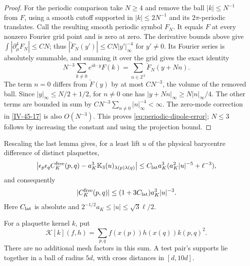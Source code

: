 \documentclass[11pt,letterpaper,reqno]{amsart}
\theoremstyle{definition}
\theoremstyle{remark}
\begin{document}
\begin{proof}
For the periodic comparison take $N\ge4$ and remove the ball
$|k|\le N^{-1}$ from $F$, using a smooth cutoff supported
in $|k|\le2N^{-1}$ and its $2\pi$-periodic translates.
Call the resulting smooth periodic symbol $F_N$.  It equals
$F$ at every nonzero Fourier grid point and is zero at zero.
The derivative bounds above give
$\int|\partial_\mu^4F_N|\le CN$; thus
$|\check F_N(y')|\le CN|y'|_\infty^{-4}$ for $y'\ne0$.
Its Fourier series is absolutely summable, and summing it over
the grid gives the exact identity
\[
 N^{-3}\sum_{k\ne0}e^{ik\cdot y}F(k)
                         =\sum_{n\in\mathbb Z^3}\check F_N(y+Nn).
\]
The term $n=0$ differs from $\check F(y)$ by at most $CN^{-3}$,
the volume of the removed ball.  Since
$|y|_\infty\le N/2+1/2$, for $n\ne0$ one has
$|y+Nn|_\infty\ge N|n|_\infty/4$.  The other terms are
bounded in sum by
$CN^{-3}\sum_{n\ne0}|n|_\infty^{-4}<\infty$.
The zero-mode correction in \eqref{IV-45-17} is also $O(N^{-3})$.
This proves \eqref{eq:periodic-dipole-error}; $N\le3$ follows
by increasing the constant and using the projection bound.
\end{proof}

Rescaling the last lemma gives, for a least lift $u$ of the
physical barycentre difference of distinct plaquettes,
\begin{equation}\label{IV-45-31}
 \big|\epsilon_p\epsilon_q C^{\rm free}_K(p,q)
           -a_K^3\mathbb K_3(u)_{\lambda(p)\lambda(q)}\big|
   \le C_{\rm lat}a_K^3(a_K^2|u|^{-5}+\ell^{-3}),
\end{equation}
and consequently
\begin{equation}\label{IV-45-32}
 |C^{\rm free}_K(p,q)|\le(1+3C_{\rm lat})a_K^3|u|^{-3}.
\end{equation}
Here $C_{\rm lat}$ is absolute and
$2^{-1/2}a_K\le|u|\le\sqrt3\ell/2$.


For a plaquette kernel $k$, put
\[
 \mathcal K[k](f,h)=\sum_{p,q}f(x(p))h(x(q))k(p,q)^2.
\]
There are no additional mesh factors in this sum. A test pair's
supports lie together in a ball of radius $5d$, with cross distances
in $[d,10d]$.
\end{document}
